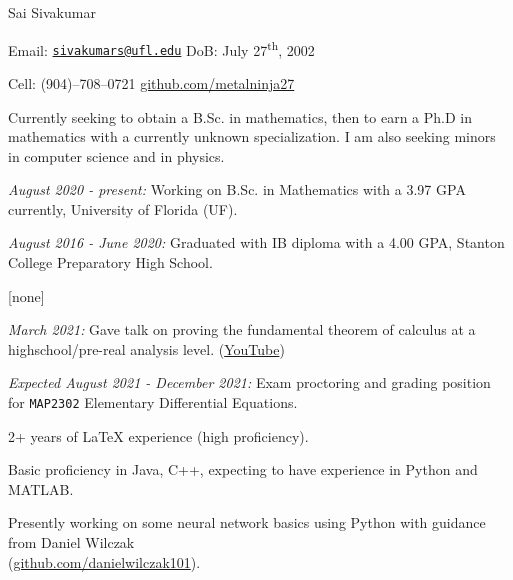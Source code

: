 \documentclass[11pt]{article}
\begin{document}
{\huge Sai Sivakumar}

Email: \href{mailto:sivakumars@ufl.edu}{\texttt{sivakumars@ufl.edu}}\hspace{5cm} DoB: July 27\textsuperscript{th}, 2002

Cell: (904)--708--0721\hspace{6.3cm} \href{https://github.com/metalninja27}{github.com/metalninja27} \\

\noindent{}

Currently seeking to obtain a B.Sc. in mathematics, then to earn a Ph.D in mathematics with a currently unknown specialization. I am also seeking minors in computer science and in physics.

\noindent{}

\textsl{August 2020 - present:} Working on B.Sc. in Mathematics with a 3.97 GPA currently, University of Florida (UF).

\textsl{August 2016 - June 2020:} Graduated with IB diploma with a 4.00 GPA, Stanton College Preparatory High School.

\noindent{}

[none]

\noindent{}

\textsl{March 2021:} Gave talk on proving the fundamental theorem of calculus at a highschool/pre-real analysis level. ({\color{blue}\href{https://youtu.be/l4GO-n-2ETQ}{YouTube}})

\noindent{}

\textsl{Expected August 2021 - December 2021:} Exam proctoring and grading position for \texttt{MAP2302} Elementary Differential Equations.

\noindent{}

2+ years of \LaTeX\hspace{1pt} experience (high proficiency).

Basic proficiency in Java, C++, expecting to have experience in Python and MATLAB. 

Presently working on some neural network basics using Python with guidance from Daniel Wilczak\\ (\href{https://github.com/danielwilczak101}{github.com/danielwilczak101}).
\end{document}
